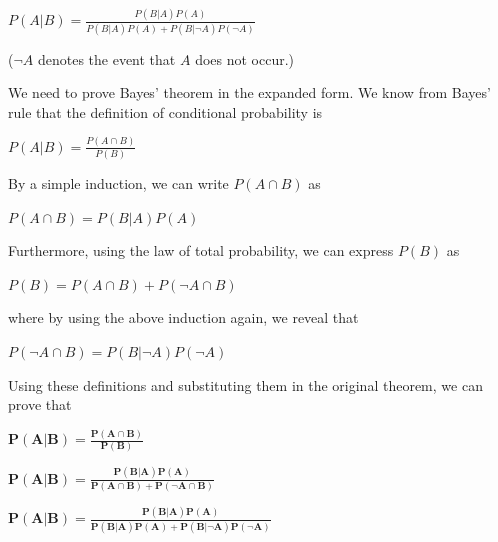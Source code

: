 \documentclass[12pt,letterpaper, onecolumn]{exam}
\begin{document}
\begin{questions}
\begin{parts}
        \begin{center}
            $\displaystyle{P(A|B) = \frac{P(B|A)P(A)}{P(B|A)P(A) + P(B|\lnot A)P(\lnot A)}}$
        \end{center}

        ($\lnot A$ denotes the event that $A$ does not occur.)

        \begin{solution}

            We need to prove Bayes' theorem in the expanded form. We know from Bayes' rule that the definition of conditional probability is
            
            \begin{center}
                $\displaystyle{P(A|B) = \frac{P(A \cap B)}{P(B)}}$
            \end{center}

            By a simple induction, we can write $\displaystyle{P(A \cap B)}$ as

            \begin{center}
                $\displaystyle{P(A \cap B)= P(B|A)P(A)}$
            \end{center}

            Furthermore, using the law of total probability, we can express $\displaystyle{P(B)}$ as

            \begin{center}
                $\displaystyle{P(B) = P(A \cap B) + P(\lnot A \cap B)}$
            \end{center}

            where by using the above induction again, we reveal that

            \begin{center}
                $\displaystyle{P(\lnot A \cap B)= P(B|\lnot A)P(\lnot A)}$
            \end{center}

            Using these definitions and substituting them in the original theorem, we can prove that 

            \begin{center}
                $\boldsymbol{\displaystyle{P(A|B) = \frac{P(A \cap B)}{P(B)}}}$

                $\boldsymbol{\displaystyle{P(A|B) = \frac{P(B|A)P(A)}{P(A \cap B) + P(\lnot A \cap B)}}}$

                $\boldsymbol{\displaystyle{P(A|B) = \frac{P(B|A)P(A)}{P(B|A)P(A) + P(B|\lnot A)P(\lnot A)}}}$
            \end{center}


\end{solution}
\end{parts}
\end{questions}
\end{document}
